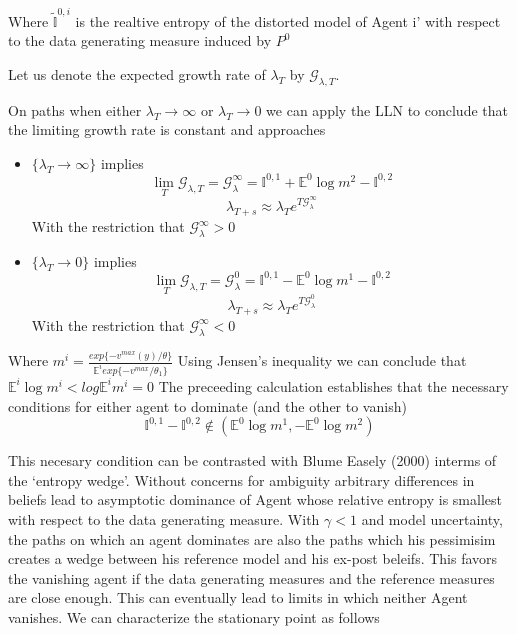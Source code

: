 \documentclass[12pt]{article}
\begin{document}
Where $\tilde{\mathbb{I}}^{0,i}$ is the realtive entropy of the distorted model of Agent i' with respect to the data generating measure induced by $P^0$

Let us denote the expected growth rate of $\lambda_T$ by $\mathcal{G}_{\lambda,T}$.

On paths when either $\lambda_T\to \infty$ or $\lambda_T\to 0$ we can apply the LLN to conclude that the limiting growth rate is constant and approaches
\begin{itemize}
\item  $\{\lambda_T \to \infty\}$ implies
\[\lim_{T}\mathcal{G}_{\lambda,T}=\mathcal{G}^{\infty}_{\lambda}=\mathbb{I}^{0,1}+\mathbb{E}^0 \log m^2 - \mathbb{I}^{0,2}\]
\[\lambda_{T+s} \approx \lambda_{T} e^{T \mathcal{G}^{\infty}_{\lambda} }\]
With the restriction that $\mathcal{G}^{\infty}_{\lambda}>0$

\item  $\{\lambda_T \to 0\}$ implies
\[\lim_{T}\mathcal{G}_{\lambda,T}=\mathcal{G}^{0}_{\lambda}=\mathbb{I}^{0,1}-\mathbb{E}^0 \log m^1 - \mathbb{I}^{0,2}\]
\[\lambda_{T+s} \approx \lambda_{T} e^{T \mathcal{G}^{0}_{\lambda} }\]
With the restriction that $\mathcal{G}^{\infty}_{\lambda}<0$
\end{itemize}

Where $m^i=\frac{exp\{ -v^{max}(y)/\theta\}}{\mathbb{E}^i exp\{ -v^{max}/\theta_1\}}$
Using Jensen's inequality we can conclude that $\mathbb{E}^i \log m^i <log \mathbb{E}^i m^i=0$
The preceeding calculation establishes that the necessary conditions for either agent to dominate (and the other to vanish) 
\begin{equation}
 \mathbb{I}^{0,1}-\mathbb{I}^{0,2} \notin (\mathbb{E}^0\log m^1,-\mathbb{E}^0\log m^2)
\end{equation}

This necesary condition can be contrasted with Blume Easely (2000)  interms of the `entropy wedge'. Without concerns for ambiguity arbitrary differences in beliefs lead to asymptotic dominance of Agent whose relative entropy is smallest with respect to the data generating measure. With $\gamma < 1$ and model uncertainty, the paths on which an agent dominates are also the paths which his pessimisim creates a wedge between his reference model and his ex-post beleifs. This favors the vanishing agent if the data generating measures and the reference measures are close enough. This can eventually lead to limits in which neither Agent vanishes.  We can characterize the stationary point as follows
\end{document}
